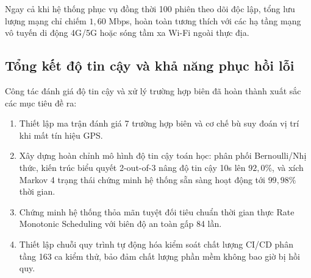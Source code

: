 \begin{table}[H]
\centering
\caption{Đo đạc thông lượng băng thông mạng và độ trễ gói tin WebSocket theo số lượng phiên đồng thời}
\label{tab:network-bandwidth-scaling-w13}
\end{table}

Ngay cả khi hệ thống phục vụ đồng thời 100 phiên theo dõi độc lập, tổng lưu lượng mạng chỉ chiếm $1{,}60$ Mbps, hoàn toàn tương thích với các hạ tầng mạng vô tuyến di động 4G/5G hoặc sóng tầm xa Wi-Fi ngoài thực địa.

\subsection{Tổng kết độ tin cậy và khả năng phục hồi lỗi}

\hspace{0.5cm} Công tác đánh giá độ tin cậy và xử lý trường hợp biên đã hoàn thành xuất sắc các mục tiêu đề ra:
\begin{enumerate}
    \item Thiết lập ma trận đánh giá 7 trường hợp biên và cơ chế bù suy đoán vị trí khi mất tín hiệu GPS.
    \item Xây dựng hoàn chỉnh mô hình độ tin cậy toán học: phân phối Bernoulli/Nhị thức, kiến trúc biểu quyết 2-out-of-3 nâng độ tin cậy 10s lên $92{,}0\%$, và xích Markov 4 trạng thái chứng minh hệ thống sẵn sàng hoạt động tới $99{,}98\%$ thời gian.
    \item Chứng minh hệ thống thỏa mãn tuyệt đối tiêu chuẩn thời gian thực Rate Monotonic Scheduling với biên độ an toàn gấp 84 lần.
    \item Thiết lập chuỗi quy trình tự động hóa kiểm soát chất lượng CI/CD phân tầng 163 ca kiểm thử, bảo đảm chất lượng phần mềm không bao giờ bị hồi quy.
\end{enumerate}
